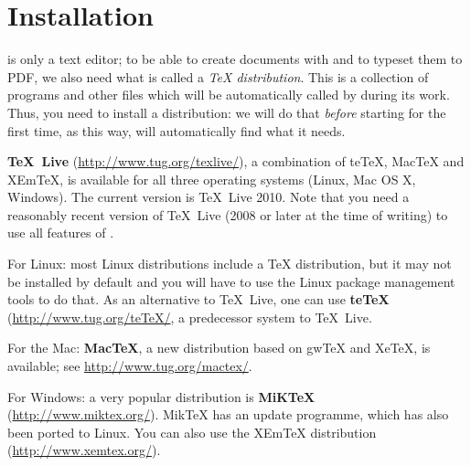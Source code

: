 
\chapter{Installation}
\label{chap.installation}

\Tw{} is only a text editor; to be able to create documents with \AllTeX{} and to typeset them to PDF, we also need what is called a \emph{{\TeX} distribution}. This is a collection of programs and other files which will be automatically called by {\Tw} during its work. Thus, you need to install a distribution: we will do that \emph{before} starting {\Tw} for the first time, as this way, {\Tw} will automatically find what it needs.

\textbf{TeX~Live} (\url{http://www.tug.org/texlive/}), a combination of teTeX, MacTeX and XEmTeX, is available for all three operating systems (Linux, Mac OS X, Windows). The current version is TeX~Live 2010. Note that you need a reasonably recent version of TeX~Live (2008 or later at the time of writing) to use all features of {\Tw}.

\begin{OSLinux}
For Linux: most Linux distributions include a {\TeX} distribution, but it may not be installed by default and you will have to use the Linux package management tools to do that. As an alternative to TeX~Live, one can use \textbf{teTeX} (\url{http://www.tug.org/teTeX/}, a predecessor system to TeX~Live.
\end{OSLinux}

\begin{OSMac}
For the Mac: \textbf{MacTeX}, a new distribution based on gwTeX and XeTeX, is available; see \url{http://www.tug.org/mactex/}.
\end{OSMac}

\begin{OSWindows}
For Windows: a very popular distribution is \textbf{MiKTeX} (\url{http://www.miktex.org/}). MikTeX has an update programme, which has also been ported to Linux. You can also use the XEmTeX distribution (\url{http://www.xemtex.org/}).
\end{OSWindows}

